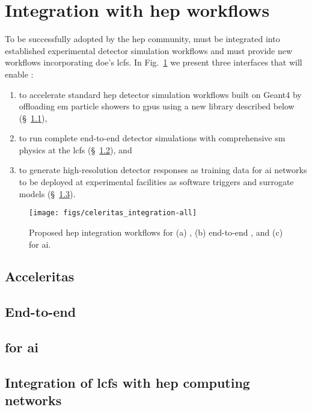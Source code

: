 \section{Integration with \ac{hep} workflows}

To be successfully adopted by the \ac{hep} community, \celeritas must be
integrated into established experimental detector simulation workflows and must
provide new workflows incorporating \ac{doe}'s \acp{lcf}. In
Fig.~\ref{fig:celeritas-hep-workflows} we present three interfaces that will
enable \celeritas:
\begin{enumerate}[itemsep=0pt, label=(\alph*)]
  \item to accelerate standard \ac{hep} detector simulation workflows built on
    Geant4 by offloading \ac{em} particle showers to \acp{gpu} using a new
    \acceleritas library described below (\S~\ref{sec:acceleritas}),
  \item to run complete end-to-end detector simulations with comprehensive
    \ac{sm} physics at the \acp{lcf} (\S~\ref{sec:end-to-end}), and
  \item to generate high-resolution detector responses as training data for
    \ac{ai} networks to be deployed at experimental facilities as software
    triggers and surrogate models (\S~\ref{sec:celeritas-ai}).
\end{enumerate}
\begin{figure}
    \centering
    \texttt{[image: figs/celeritas\_integration-all]}
    \caption{Proposed \acs{hep} integration workflows for (a) \acceleritas, (b)
    end-to-end \celeritas, and (c) \celeritas for \acs{ai}.}
    \label{fig:celeritas-hep-workflows}
\end{figure}

\subsection{Acceleritas}
\label{sec:acceleritas}

\subsection{End-to-end \celeritas}
\label{sec:end-to-end}

\subsection{\celeritas for \ac{ai}}
\label{sec:celeritas-ai}

\subsection{Integration of \acp{lcf} with \ac{hep} computing networks}
